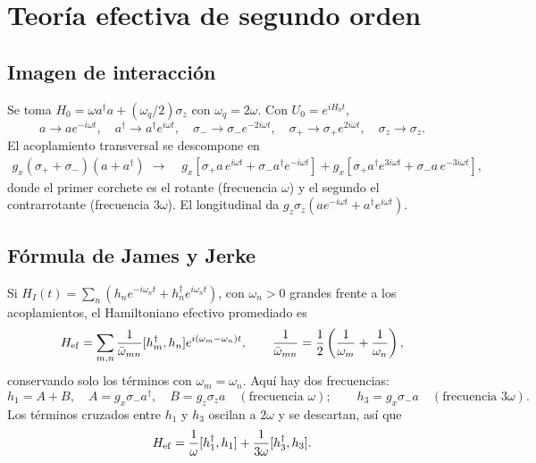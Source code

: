 \documentclass[11pt]{report}
\newcommand{\spl}{\sigma_{+}}
\newcommand{\smi}{\sigma_{-}}
\begin{document}
\section{Teor\'ia efectiva de segundo orden}

\subsection{Imagen de interacci\'on}

Se toma $H_{0}=\omega a^{\dagger}a+(\omega_{q}/2)\sigma_{z}$ con $\omega_{q}=2\omega$. Con $U_{0}=e^{iH_{0}t}$,
\begin{equation}
a\to a e^{-i\omega t},\quad a^{\dagger}\to a^{\dagger}e^{i\omega t},\quad \smi\to\smi e^{-2i\omega t},\quad \spl\to\spl e^{2i\omega t},\quad \sigma_{z}\to\sigma_{z}.
\end{equation}
El acoplamiento transversal se descompone en
\begin{align}
g_{x}(\spl+\smi)(a+a^{\dagger})\;\to\;&g_{x}\left[\spl a\,e^{i\omega t}+\smi a^{\dagger}e^{-i\omega t}\right]+g_{x}\left[\spl a^{\dagger}e^{3i\omega t}+\smi a\,e^{-3i\omega t}\right],
\end{align}
donde el primer corchete es el rotante (frecuencia $\omega$) y el segundo el contrarrotante (frecuencia $3\omega$). El longitudinal da $g_{z}\sigma_{z}(ae^{-i\omega t}+a^{\dagger}e^{i\omega t})$.

\subsection{F\'ormula de James y Jerke}

Si $H_{I}(t)=\sum_{n}(h_{n}e^{-i\omega_{n}t}+h_{n}^{\dagger}e^{i\omega_{n}t})$, con $\omega_{n}>0$ grandes frente a los acoplamientos, el Hamiltoniano efectivo promediado es \cite{JamesJerke2007}
\begin{equation}
H_{\rm ef}=\sum_{m,n}\frac{1}{\bar\omega_{mn}}[h_{m}^{\dagger},h_{n}]e^{i(\omega_{m}-\omega_{n})t},\qquad \frac{1}{\bar\omega_{mn}}=\frac{1}{2}\left(\frac{1}{\omega_{m}}+\frac{1}{\omega_{n}}\right),
\end{equation}
conservando solo los t\'erminos con $\omega_{m}=\omega_{n}$. Aqu\'i hay dos frecuencias:
\begin{equation}
h_{1}=A+B,\quad A=g_{x}\smi a^{\dagger},\quad B=g_{z}\sigma_{z}a\quad(\text{frecuencia }\omega);\qquad h_{3}=g_{x}\smi a\quad(\text{frecuencia }3\omega).
\end{equation}
Los t\'erminos cruzados entre $h_{1}$ y $h_{3}$ oscilan a $2\omega$ y se descartan, as\'i que
\begin{equation}
H_{\rm ef}=\frac{1}{\omega}[h_{1}^{\dagger},h_{1}]+\frac{1}{3\omega}[h_{3}^{\dagger},h_{3}].
\end{equation}
\end{document}
